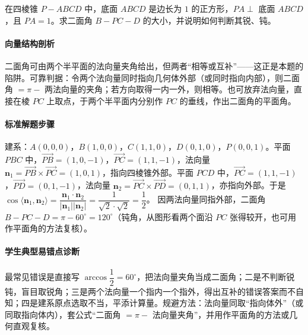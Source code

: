 \begin{problem}
在四棱锥 $P-ABCD$ 中，底面 $ABCD$ 是边长为 $1$ 的正方形，$PA\perp$ 底面 $ABCD$，且 $PA=1$。求二面角 $B-PC-D$ 的大小，并说明如何判断其锐、钝。
\end{problem}
\begin{solution}
\paragraph{向量结构剖析}
二面角可由两个半平面的法向量夹角给出，但两者“相等或互补”——这正是本题的陷阱。可靠判据：令两个法向量同时指向几何体外部（或同时指向内部），则二面角 $=\pi-$ 两法向量的夹角；若方向取得一内一外，则相等。也可放弃法向量，直接在棱 $PC$ 上取点，于两个半平面内分别作 $PC$ 的垂线，作出二面角的平面角。
\paragraph{标准解题步骤}
建系：$A(0,0,0)$，$B(1,0,0)$，$C(1,1,0)$，$D(0,1,0)$，$P(0,0,1)$。平面 $PBC$ 中，$\overrightarrow{PB}=(1,0,-1)$，$\overrightarrow{PC}=(1,1,-1)$，法向量 $\bm n_1=\overrightarrow{PB}\times\overrightarrow{PC}=(1,0,1)$，指向四棱锥外部。平面 $PCD$ 中，$\overrightarrow{PC}=(1,1,-1)$，$\overrightarrow{PD}=(0,1,-1)$，法向量 $\bm n_2=\overrightarrow{PC}\times\overrightarrow{PD}=(0,1,1)$，亦指向外部。于是
$\cos\langle\bm n_1,\bm n_2\rangle=\dfrac{\bm n_1\cdot\bm n_2}{|\bm n_1||\bm n_2|}=\dfrac{1}{\sqrt2\cdot\sqrt2}=\dfrac12$。
因两法向量同指外部，二面角 $B-PC-D=\pi-60^\circ=120^\circ$（钝角，从图形看两个面沿 $PC$ 张得较开，也可用作平面角的方法复核）。
\paragraph{学生典型易错点诊断}
最常见错误是直接写 $\arccos\dfrac12=60^\circ$，把法向量夹角当成二面角；二是不判断锐钝，盲目取锐角；三是两个法向量一个指内一个指外，得出互补的错误答案而不自知；四是建系原点选取不当，平添计算量。规避方法：法向量同取“指向体外”（或同取指向体内），套公式“二面角 $=\pi-$ 法向量夹角”，并用作平面角的方法或几何直观复核。
\end{solution}
